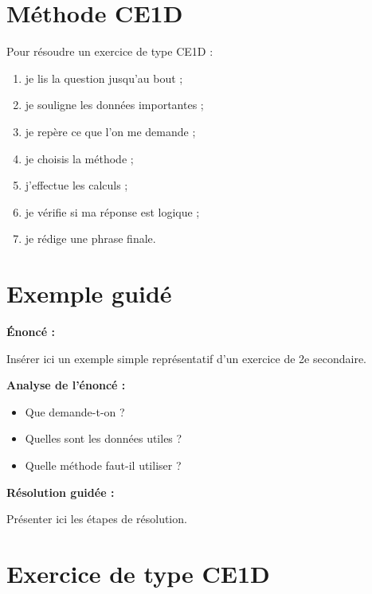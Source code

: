 \documentclass[11pt,a4paper]{article}
\begin{document}
\section{Méthode CE1D}

\begin{cadremethode}
Pour résoudre un exercice de type CE1D :

\begin{enumerate}
    \item je lis la question jusqu’au bout ;
    \item je souligne les données importantes ;
    \item je repère ce que l’on me demande ;
    \item je choisis la méthode ;
    \item j’effectue les calculs ;
    \item je vérifie si ma réponse est logique ;
    \item je rédige une phrase finale.
\end{enumerate}
\end{cadremethode}

\section{Exemple guidé}

\begin{cadreexemple}
\textbf{Énoncé :}

Insérer ici un exemple simple représentatif d’un exercice de 2e secondaire.

\medskip

\textbf{Analyse de l’énoncé :}
\begin{itemize}
    \item Que demande-t-on ?
    \item Quelles sont les données utiles ?
    \item Quelle méthode faut-il utiliser ?
\end{itemize}

\medskip

\textbf{Résolution guidée :}

Présenter ici les étapes de résolution.
\end{cadreexemple}

\section{Exercice de type CE1D}
\end{document}
